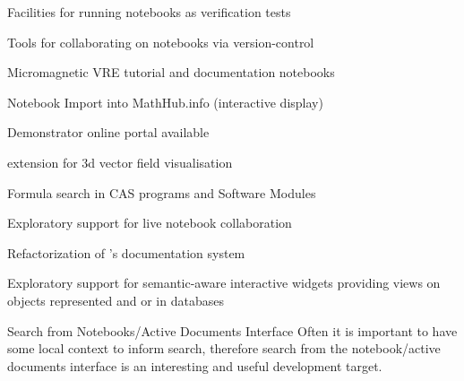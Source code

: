 \begin{workpackage}
\begin{wpdelivs}
  \begin{wpdeliv}[due=18,id=jupyter-test,dissem=PU,nature=OTHER,lead=SR]
      {Facilities for running notebooks as verification tests}
  \end{wpdeliv}

  \begin{wpdeliv}[due=12,id=jupyter-collab,dissem=PU,nature=OTHER,lead=SR]
      {Tools for collaborating on notebooks via version-control}
  \end{wpdeliv}
    \begin{wpdeliv}[due=21,id=oommf-nb-documentation,dissem=PU,nature=DEM,lead=USO]
      {Micromagnetic VRE tutorial and documentation notebooks}
    \end{wpdeliv}
    \begin{wpdeliv}[id=jupyter-import,due=24,nature=DEM,dissem=PU,lead=JU]
      {Notebook Import into MathHub.info (interactive display)}
    \end{wpdeliv}
    \begin{wpdeliv}[due=24,id=oommf-nb-tmp,dissem=PU,nature=DEC,lead=USO]
      {Demonstrator online portal available}
    \end{wpdeliv}
  \begin{wpdeliv}[due=24,id=cfd-vis,dissem=PU,nature=OTHER,lead=SR]
      {\Jupyter extension for 3d vector field visualisation}
  \end{wpdeliv}
   \begin{wpdeliv}[id=cassearch,due=30,nature=OTHER,dissem=PU,lead=JU]
      {Formula search in CAS programs and Software Modules}
    \end{wpdeliv}
  \begin{wpdeliv}[due=36,id=jupyter-live-collab,dissem=PU,nature=OTHER,lead=SR]
      {Exploratory support for live notebook collaboration}
  \end{wpdeliv}
  \begin{wpdeliv}[due=24,id=sage-sphinx,dissem=PU,nature=OTHER,lead=PS]
      {Refactorization of \Sage's \Sphinx documentation system}
  \end{wpdeliv}
  \begin{wpdeliv}[due=36,id=ipython-advanced-interacts,dissem=PU,nature=DEM,lead=PS]
      {Exploratory support for semantic-aware interactive widgets providing views on objects
      represented and or in databases}
  \end{wpdeliv}
\begin{wpdeliv}[id=nbad-search,due=42,nature=OTHER,dissem=PU,lead=JU]
  {Search from Notebooks/Active Documents Interface} Often it is important to have some
  local context to inform search, therefore search from the notebook/active documents
  interface is an interesting and useful development target.
\end{wpdeliv}



\end{wpdelivs}
\end{workpackage}
